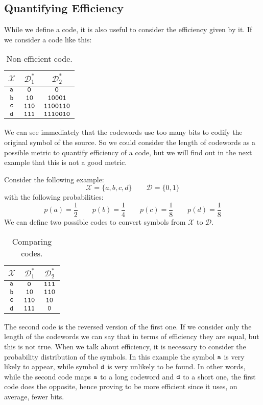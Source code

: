 \subsection{Quantifying Efficiency}
While we define a code, it is also useful to consider the efficiency given by it. If we consider a code like this:
\begin{table}[H]
	\center
\begin{tabular}{| c | c | c |}
	\hline
	$\mathcal{X}$ & $\mathcal{D}^*_1$ & $\mathcal{D}^*_2$\\\hline
	$\verb|a|$ & $\verb|0|$ & $\verb|0|$ \\
	$\verb|b|$ & $\verb|10|$ & $\verb|10001|$ \\
	$\verb|c|$ & $\verb|110|$ & $\verb|1100110|$ \\
	$\verb|d|$ & $\verb|111|$ & $\verb|1110010|$ \\
	\hline
\end{tabular}
\caption{Non-efficient code.}
\end{table}
We can see immediately that the codewords use too many bits to codify the original symbol of the source. So we could consider the length of codewords as a possible metric to quantify efficiency of a code, but we will find out in the next example that this is not a good metric.
\begin{exmp} Consider the following example:
	$$\mathcal{X} = \{a, b, c, d\} \qquad \mathcal{D} = \{0,1\}$$
	with the following probabilities:
	$$p(a) = \frac{1}{2} \qquad p(b) = \frac{1}{4} \qquad p(c) = \frac{1}{8} \qquad p(d) = \frac{1}{8}$$
	We can define two possible codes to convert symbols from $\mathcal{X}$ to $\mathcal{D}$.
	\begin{table}[H]
		\centering
		\begin{tabular}{| c | c | c |}
			\hline
			$\mathcal{X}$ & $\mathcal{D}^*_1$ & $\mathcal{D}^*_2$\\\hline
			$\verb|a|$ & $\verb|0|$ & $\verb|111|$ \\
			$\verb|b|$ & $\verb|10|$ & $\verb|110|$ \\
			$\verb|c|$ & $\verb|110|$ & $\verb|10|$ \\
			$\verb|d|$ & $\verb|111|$ & $\verb|0|$ \\
			\hline
		\end{tabular}
		\caption{Comparing codes.}
	\end{table}
\end{exmp}
The second code is the reversed version of the first one. If we consider only the length of the codewords we can say that in terms of efficiency they are equal, but this is not true. When we talk about efficiency, it is necessary to consider the probability distribution of the symbols. In this example the symbol $\verb|a|$ is very likely to appear, while symbol $\verb|d|$ is very unlikely to be found. In other words, while the second code maps $\verb|a|$ to a long codeword and $\verb|d|$ to a short one, the first code does the opposite, hence proving to be more efficient since it uses, on average, fewer bits.\\
